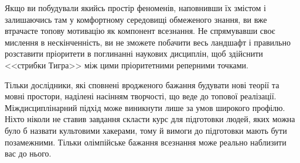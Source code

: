 Якщо ви побудували якийсь простір феноменів, наповнивши
їх змістом і залишаючись там у комфортному середовищі
обмеженого знання, ви вже втрачаєте топову мотивацію
як компонент всезнання. Не спрямувавши своє мислення
в нескінченність, ви не зможете побачити весь ландшафт
і правильно розставити пріоритети в поглинанні наукових
дисциплін, щоб здійснити <<стрибки Тигра>> між цими
пріоритетними реперними точками.

Тільки дослідники, які сповнені вродженого бажання будувати
нові теорії та мовні простори, наділені насінням творчості,
що веде до топової реалізації. Міждисциплінарний підхід може
виникнути лише за умов широкого профілю. Ніхто ніколи не
ставив завдання скласти курс для підготовки людей, яких
можна було б назвати культовими хакерами, тому й вимоги
до підготовки мають бути позамежними. Тільки олімпійське
бажання всезнання може реально наблизити вас до нього.

\normalsize
